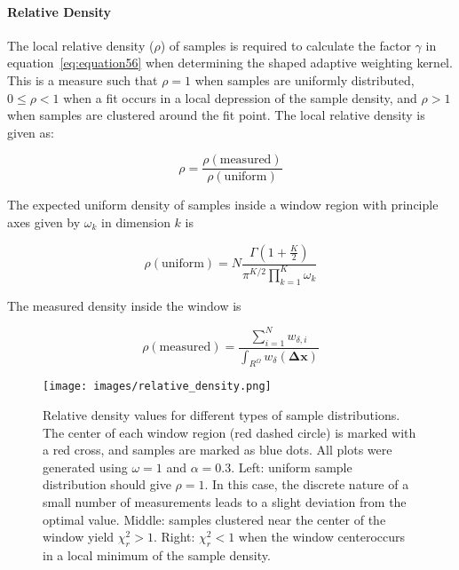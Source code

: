 \paragraph{Relative Density}
\label{paragraph:relative-density}
The local relative density ($\rho$) of samples is required to calculate the
factor $\gamma$ in equation~\ref{eq:equation56} when determining the shaped
adaptive weighting kernel.
This is a measure such that $\rho=1$ when samples are uniformly distributed,
$0 \leq \rho < 1$ when a fit occurs in a local depression of the sample density,
and $\rho > 1$ when samples are clustered around the fit point.
The local relative density is given as:

\begin{equation}
    \rho = \frac{\rho(\text{measured})}{\rho(\text{uniform})}
    \label{eq:equation57}
\end{equation}

The expected uniform density of samples inside a window region with principle
axes given by $\omega_k$ in dimension $k$ is

\begin{equation}
    \rho(\text{uniform}) = N \frac{\Gamma \left( 1 + \frac{K}{2} \right)}
                              {\pi^{K/2} \prod_{k=1}^{K}{\omega_k}}
    \label{eq:equation58}
\end{equation}

The measured density inside the window is

\begin{equation}
    \rho(\text{measured}) = \frac
        {\sum_{i=1}^{N}{w_{\delta, i}}}
        {\int_{R^{\Omega}} w_{\delta}(\mathbf{\Delta x})}
    \label{eq:equation59}
\end{equation}

\begin{figure}[H]
  \begin{center}
  \texttt{[image: images/relative\_density.png]}
  \caption{Relative density values for different types of sample distributions.
           The center of each window region (red dashed circle) is marked with
           a red cross, and samples are marked as blue dots.  All plots were
           generated using $\omega = 1$ and $\alpha=0.3$.  Left: uniform
           sample distribution should give $\rho=1$.  In this case, the
           discrete nature of a small number of measurements leads to a slight
           deviation from the optimal value.  Middle: samples clustered near
           the center of the window yield $\chi_r^2 > 1$.  Right:
           $\chi_r^2 < 1$ when the window centeroccurs in a local minimum of
           the sample density.}
  \label{fig:relative_density}
  \end{center}
\end{figure}


